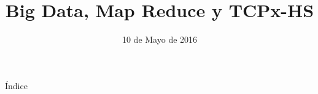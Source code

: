 \documentclass[compress]{beamer}
\title{Big Data, Map Reduce y TCPx-HS}
\author[Ingeniería de Servidores]{}
\date{10 de Mayo de 2016}
\newcommand{\importsection}[1]{}           %
\begin{document}
	{
		\begin{frame}[plain]
			\titlepage
		\end{frame}			
	}

	\importsection{Motivacion.tex}

	\begin{frame}{Índice}
		\hypertarget{index}{}
		\tableofcontents
	\end{frame}
	
	\importsection{BigData.tex}

	\importsection{MapReduce.tex}

	\importsection{TPCx-HS.tex}

	\importsection{Conclusion.tex}
	
\end{document}
